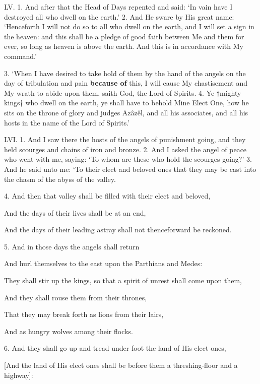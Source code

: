LV. 1. And after that the Head of Days repented
and said: ‘In vain have I destroyed all who dwell on
the earth.’ 2. And He sware by His great name:
‘Henceforth I will not do so to all who dwell on the
earth, and I will set a sign in the heaven: and this
shall be a pledge of good faith between Me and them
for ever, so long as heaven is above the earth. And
this is in accordance with My command.’


3. ‘When I have desired to take hold of them by the
hand of the angels on the day of tribulation and pain
\textbf{because of} this, I will cause My chastisement and My
wrath to abide upon them, saith God, the Lord of
Spirits. 4. Ye †mighty kings† who dwell on the
earth, ye shall have to behold Mine Elect One, how
he sits on the throne of glory and judges Azâzêl, and
all his associates, and all his hosts in the name of the
Lord of Spirits.’

LVI. 1. And I saw there the hosts of the angels of
punishment going, and they held scourges and chains
of iron and bronze. 2. And I asked the angel of
peace who went with me, saying: ‘To whom are
these who hold the scourges going?’ 3. And he
said unto me: ‘To their elect and beloved ones that
they may be cast into the chasm of the abyss of the
valley.

4. And then that valley shall be filled with their elect and beloved,

And the days of their lives shall be at an end,

And the days of their leading astray shall not thenceforward be reckoned.


5. And in those days the angels shall return

And hurl themselves to the east upon the Parthians and Medes:

They shall stir up the kings, so that a spirit of unrest shall come upon them,

And they shall rouse them from their thrones,

That they may break forth as lions from their lairs,

And as hungry wolves among their flocks.

6. And they shall go up and tread under foot the land of His elect ones,

[And the land of His elect ones shall be before them a threshing-floor and a highway]:

